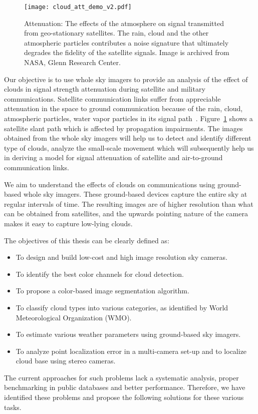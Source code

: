 \begin{figure}[htb]
\begin{center}
\texttt{[image: cloud\_att\_demo\_v2.pdf]}
\caption[Illustration of cloud attenuation in satellite communication links.]{Attenuation: The effects of the atmosphere on signal transmitted from geo-stationary satellites. The rain, cloud and the other atmospheric particles contributes a noise signature that ultimately degrades the fidelity of the satellite signals. Image is archived from NASA, Glenn Research Center.
\label{fig:cloud_att}}
\end{center}
\end{figure}

Our objective is to use whole sky imagers to provide an analysis of the effect of clouds in signal strength attenuation during satellite and military communications. Satellite communication links suffer from appreciable attenuation in the space to ground communication because of the rain, cloud, atmospheric particles, water vapor particles in its signal path~\cite{site_diversity,GammaDrop}. Figure~\ref{fig:cloud_att} shows a satellite slant path which is affected by propagation impairments. The images obtained from the whole sky imagers will help us to detect and identify different type of clouds, analyze the small-scale movement which will subsequently help us in deriving a model for signal attenuation of satellite and air-to-ground communication links.

We aim to understand the effects of clouds on communications using ground-based whole sky imagers. These ground-based devices capture the entire sky at regular intervals of time. The resulting images are of higher resolution than what can be obtained from satellites, and the upwards pointing nature of the camera makes it easy to capture low-lying clouds.

The objectives of this thesis can be clearly defined as:
\begin{itemize}
\item To design and build low-cost and high image resolution sky cameras.
\item To identify the best color channels for cloud detection.
\item To propose a color-based image segmentation algorithm.
\item To classify cloud types into various categories, as identified by World Meteorological Organization (WMO).
\item To estimate various weather parameters using ground-based sky imagers.
\item To analyze point localization error in a multi-camera set-up and to localize cloud base using stereo cameras.
\end{itemize}
The current approaches for such problems lack a systematic analysis, proper benchmarking in public databases and better performance. Therefore, we have identified these problems and propose the following solutions for these various tasks.

